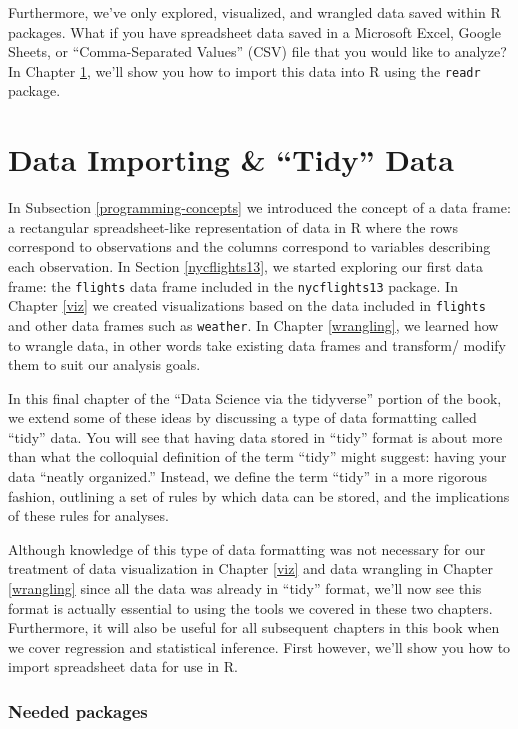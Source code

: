 \documentclass[12pt, krantz2,]{krantz}
\begin{document}
Furthermore, we've only explored, visualized, and wrangled data saved within R packages. What if you have spreadsheet data saved in a Microsoft Excel, Google Sheets, or ``Comma-Separated Values'' (CSV) file that you would like to analyze? In Chapter \ref{tidy}, we'll show you how to import this data into R using the \texttt{readr} package.

\hypertarget{tidy}{%
\chapter{Data Importing \& ``Tidy'' Data}\label{tidy}}

In Subsection \ref{programming-concepts} we introduced the concept of a data frame: a rectangular spreadsheet-like representation of data in R where the rows correspond to observations and the columns correspond to variables describing each observation. In Section \ref{nycflights13}, we started exploring our first data frame: the \texttt{flights} data frame included in the \texttt{nycflights13} package. In Chapter \ref{viz} we created visualizations based on the data included in \texttt{flights} and other data frames such as \texttt{weather}. In Chapter \ref{wrangling}, we learned how to wrangle data, in other words take existing data frames and transform/ modify them to suit our analysis goals.

In this final chapter of the ``Data Science via the tidyverse'' portion of the book, we extend some of these ideas by discussing a type of data formatting called ``tidy'' data. You will see that having data stored in ``tidy'' format is about more than what the colloquial definition of the term ``tidy'' might suggest: having your data ``neatly organized.'' Instead, we define the term ``tidy'' in a more rigorous fashion, outlining a set of rules by which data can be stored, and the implications of these rules for analyses.

Although knowledge of this type of data formatting was not necessary for our treatment of data visualization in Chapter \ref{viz} and data wrangling in Chapter \ref{wrangling} since all the data was already in ``tidy'' format, we'll now see this format is actually essential to using the tools we covered in these two chapters. Furthermore, it will also be useful for all subsequent chapters in this book when we cover regression and statistical inference. First however, we'll show you how to import spreadsheet data for use in R.

\hypertarget{needed-packages-2}{%
\subsection*{Needed packages}\label{needed-packages-2}}
\end{document}
